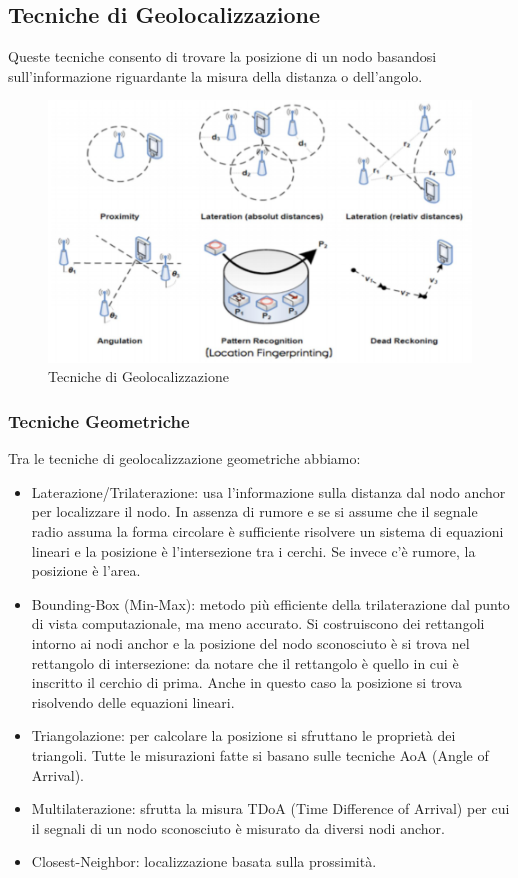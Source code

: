 \documentclass[12pt,a4paper]{article}
\begin{document}
	\subsection{Tecniche di Geolocalizzazione}\label{subsec3.5}
	Queste tecniche consento di trovare la posizione di un nodo basandosi sull'informazione riguardante la misura della distanza o dell'angolo.
	\begin{figure}
		\centering
		\includegraphics[scale=0.6]{fig5-lec3pt1.png}
		\caption{Tecniche di Geolocalizzazione}
		\label{fig:fig5-lec3pt1}
	\end{figure}
	
	\subsubsection{Tecniche Geometriche}\label{subsubsec3.5.1}
	Tra le tecniche di geolocalizzazione geometriche abbiamo:
	\begin{itemize}
		\item Laterazione/Trilaterazione: usa l'informazione sulla distanza dal nodo anchor per localizzare il nodo. In assenza di rumore e se si assume che il segnale radio assuma la forma circolare è sufficiente risolvere un sistema di equazioni lineari e la posizione è l'intersezione tra i cerchi. Se invece c'è rumore, la posizione è l'area.
		\item Bounding-Box (Min-Max): metodo più efficiente della trilaterazione dal punto di vista computazionale, ma meno accurato. Si costruiscono dei rettangoli intorno ai nodi anchor e la posizione del nodo sconosciuto è si trova nel rettangolo di intersezione: da notare che il rettangolo è quello in cui è inscritto il cerchio di prima. Anche in questo caso la posizione si trova risolvendo delle equazioni lineari.
		\item Triangolazione: per calcolare la posizione si sfruttano le proprietà dei triangoli. Tutte le misurazioni fatte si basano sulle tecniche AoA (Angle of Arrival).
		\item Multilaterazione: sfrutta la misura TDoA (Time Difference of Arrival) per cui il segnali di un nodo sconosciuto è misurato da diversi nodi anchor.
		\item Closest-Neighbor: localizzazione basata sulla prossimità.
	\end{itemize}
\end{document}
